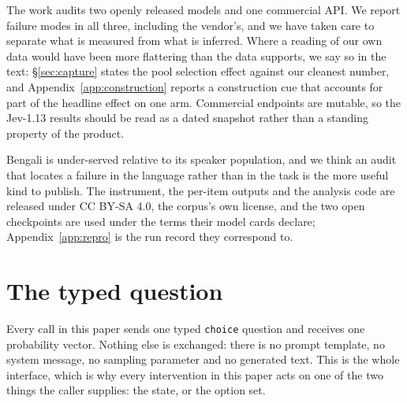 \documentclass[11pt]{article}
\begin{document}
The work audits two openly released models and one commercial API. We report
failure modes in all three, including the vendor's, and we have taken care to
separate what is measured from what is inferred. Where a reading of our own data
would have been more flattering than the data supports, we say so in the text:
\S\ref{sec:capture} states the pool selection effect against our cleanest number,
and Appendix~\ref{app:construction} reports a construction cue that accounts for
part of the headline effect on one arm. Commercial endpoints are mutable, so the
Jev-1.13 results should be read as a dated snapshot rather than a standing
property of the product.

Bengali is under-served relative to its speaker population, and we think an audit
that locates a failure in the language rather than in the task is the more useful
kind to publish. The instrument, the per-item outputs and the analysis code are released under
CC BY-SA 4.0, the corpus's own license, and the two open checkpoints are used
under the terms their model cards declare;
Appendix~\ref{app:repro} is the run record they correspond to.



\appendix

\section{The typed question}
\label{app:payload}

Every call in this paper sends one typed \texttt{choice} question and receives
one probability vector. Nothing else is exchanged: there is no prompt template,
no system message, no sampling parameter and no generated text. This is the
whole interface, which is why every intervention in this paper acts on one of the
two things the caller supplies: the state, or the option set.
\end{document}

